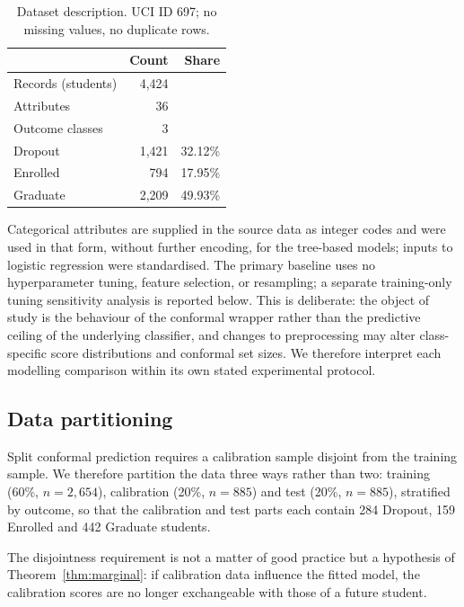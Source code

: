 \begin{table}[htbp]
\centering
\caption{Dataset description. UCI ID 697; no missing values, no duplicate rows.}
\label{tab:data}
\begin{tabular}{lrr}
\toprule
& \textbf{Count} & \textbf{Share} \\
\midrule
Records (students)      & 4{,}424 & \\
Attributes              & 36      & \\
Outcome classes         & 3       & \\
\midrule
\quad \textsf{Dropout}  & 1{,}421 & 32.12\% \\
\quad \textsf{Enrolled} &    794  & 17.95\% \\
\quad \textsf{Graduate} & 2{,}209 & 49.93\% \\
\bottomrule
\end{tabular}
\end{table}

Categorical attributes are supplied in the source data as integer codes and were
used in that form, without further encoding, for the tree-based models; inputs
to logistic regression were standardised. The primary baseline uses no hyperparameter tuning,
feature selection, or resampling; a separate training-only tuning sensitivity
analysis is reported below. This is deliberate: the object of study is the
behaviour of the conformal wrapper rather than the predictive ceiling of the
underlying classifier, and changes to preprocessing may alter class-specific score
distributions and conformal set sizes. We therefore interpret each
modelling comparison within its own stated experimental protocol.

\subsection{Data partitioning}

Split conformal prediction requires a calibration sample disjoint from the
training sample. We therefore partition the data three ways rather than two:
training (60\%, $n = 2{,}654$), calibration (20\%, $n = 885$) and test (20\%,
$n = 885$), stratified by outcome, so that the calibration and test parts each
contain 284 \textsf{Dropout}, 159 \textsf{Enrolled} and 442 \textsf{Graduate}
students.

The disjointness requirement is not a matter of good practice but a hypothesis
of Theorem~\ref{thm:marginal}: if calibration data influence the fitted model,
the calibration scores are no longer exchangeable with those of a future
student.

